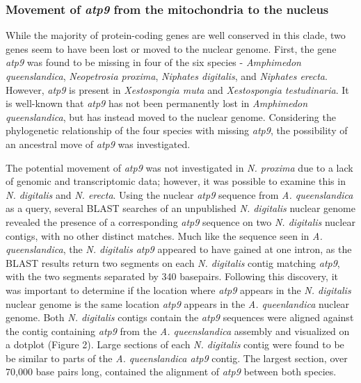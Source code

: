 \documentclass[../main.tex]{subfiles}
\begin{document}
\subsubsection{Movement of \emph{atp9} from the mitochondria to the nucleus}
While the majority of protein-coding genes are well conserved in this clade, two genes seem to have been lost or moved to the nuclear genome. First, the gene \emph{atp9} was found to be missing in four of the six species - \emph{Amphimedon queenslandica}, \emph{Neopetrosia proxima}, \emph{Niphates digitalis}, and \emph{Niphates erecta}. However, \emph{atp9} is present in \emph{Xestospongia muta} and \emph{Xestospongia testudinaria}. It is well-known that \emph{atp9} has not been permanently lost in \emph{Amphimedon queenslandica}, but has instead moved to the nuclear genome. Considering the phylogenetic relationship of the four species with missing \emph{atp9}, the possibility of an ancestral move of \emph{atp9} was investigated. 

The potential movement of \emph{atp9} was not investigated in \emph{N. proxima} due to a lack of genomic and transcriptomic data; however, it was possible to examine this in \emph{N. digitalis} and \emph{N. erecta}. Using the nuclear \emph{atp9} sequence from \emph{A. queenslandica} as a query, several BLAST searches of an unpublished \emph{N. digitalis} nuclear genome revealed the presence of a corresponding \emph{atp9} sequence on two \emph{N. digitalis} nuclear contigs, with no other distinct matches. Much like the sequence seen in \emph{A. queenslandica}, the \emph{N. digitalis atp9} appeared to have gained at one intron, as the BLAST results return two segments on each \emph{N. digitalis} contig matching \emph{atp9}, with the two segments separated by 340 basepairs. 
Following this discovery, it was important to determine if the location where \emph{atp9} appears in the \emph{N. digitalis} nuclear genome is the same location \emph{atp9} appears in the \emph{A. queenlandica} nuclear genome. Both \emph{N. digitalis} contigs contain the \emph{atp9} sequences were aligned against the contig containing \emph{atp9} from the \emph{A. queenslandica} assembly and visualized on a dotplot (Figure 2). Large sections of each \emph{N. digitalis} contig were found to be be similar to parts of the \emph{A. queenslandica atp9} contig. The largest section, over 70,000 base pairs long, contained the alignment of \emph{atp9} between both species.
\end{document}

